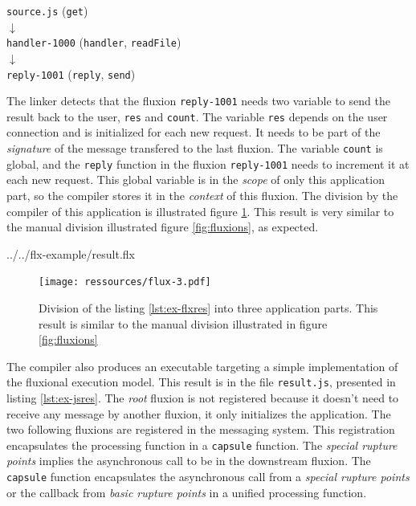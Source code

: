 \begin{center}
\texttt{source.js} (\texttt{get})\\
$\downarrow$\\
\texttt{handler-1000} (\texttt{handler}, \texttt{readFile})\\
$\downarrow$\\
\texttt{reply-1001} (\texttt{reply}, \texttt{send})
\end{center}

The linker detects that the fluxion \texttt{reply-1001} needs two variable to send the result back to the user, \texttt{res} and \texttt{count}.
The variable \texttt{res} depends on the user connection and is initialized for each new request.
It needs to be part of the \textit{signature} of the message transfered to the last fluxion.
The variable \texttt{count} is global, and the \texttt{reply} function in the fluxion \texttt{reply-1001} needs to increment it at each new request.
This global variable is in the \textit{scope} of only this application part, so the compiler stores it in the \textit{context} of this fluxion.
The division by the compiler of this application is illustrated figure \ref{fig:flux-3}.
This result is very similar to the manual division illustrated figure \ref{fig:fluxions}, as expected.

{../../flx-example/result.flx}

\begin{figure}[h!]
\begin{center}
  \texttt{[image: ressources/flux-3.pdf]}
  \caption{Division of the listing \ref{lst:ex-flxres} into three application parts. This result is similar to the manual division illustrated in figure \ref{fig:fluxions}}
  \label{fig:flux-3}
\end{center}
\end{figure}

The compiler also produces an executable targeting a simple implementation of the fluxional execution model.
This result is in the file \texttt{result.js}, presented in listing \ref{lst:ex-jsres}.
The \textit{root} fluxion is not registered because it doesn't need to receive any message by another fluxion, it only initializes the application.
The two following fluxions are registered in the messaging system.
This registration encapsulates the processing function in a \texttt{capsule} function.
The \textit{special rupture points} implies the asynchronous call to be in the downstream fluxion.
The \texttt{capsule} function encapsulates the asynchronous call from a \textit{special rupture points} or the callback from \textit{basic rupture points} in a unified processing function.

